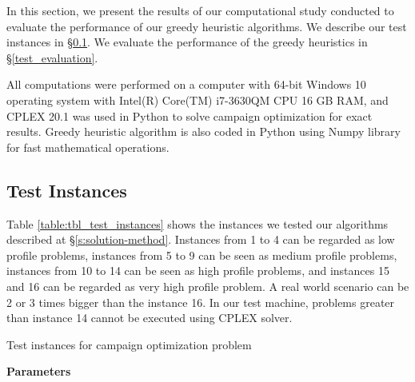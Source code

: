 \documentclass[11pt]{article}
\begin{document}
In this section, we present the results of our computational study conducted to evaluate the performance of our greedy heuristic algorithms. We describe our test instances in \S \ref{test_cases}. We evaluate the performance of the greedy heuristics in \S \ref{test_evaluation}.

All computations were performed on a computer with 64-bit Windows 10 operating system with Intel(R) Core(TM) i7-3630QM CPU 16 GB RAM, and CPLEX 20.1 was used in Python to solve campaign optimization for exact results. Greedy heuristic algorithm is also coded in Python using Numpy library for fast mathematical operations.

\subsection{Test Instances} \label{test_cases}
Table \ref{table:tbl_test_instances} shows the instances we tested our algorithms described at \S \ref{s:solution-method}. Instances from 1 to 4 can be regarded as low profile problems, instances from 5 to 9 can be seen as medium profile problems, instances from 10 to 14 can be seen as high profile problems, and instances 15 and 16 can be regarded as very high profile problem. A real world scenario can be 2 or 3 times bigger than the instance 16. In our test machine, problems greater than instance 14 cannot be executed using CPLEX solver.\\
 
\begin{table}[htb]
    \centering
    \caption[Short Caption for LoT]{Test instances for campaign optimization problem}\label{table:tbl_test_instances}
\end{table}

\noindent \textbf{Parameters}\\
\end{document}
